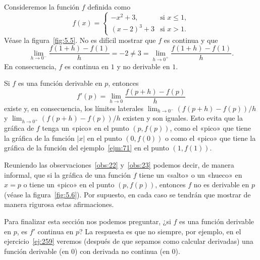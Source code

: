 \documentclass[12pt,a4paper]{book}
\begin{document}
    \begin{ejemplo}\label{ejm:71}
        Consideremos la
        función $f$ definida como
        \begin{equation*}
            f(x)=\begin{cases}
                -x^{2}+3, & \text{si }x\leq 1,\\
                (x-2)^{3}+3 & \text{si }x>1.
            \end{cases}
        \end{equation*}
        Véase la figura~\ref{fig:5.5}. No es difícil mostrar que $f$ es continua y que
        \begin{equation*}
            \lim_{h\to 0^{-}}\frac{f(1+h)-f(1)}{h}=-2\neq 3=\lim_{h\to 0^{+}}\frac{f(1+h)-f(1)}{h}.
        \end{equation*}
        En consecuencia, $f$ es continua en $1$ y no derivable en $1$.
    \end{ejemplo}

    \begin{observacion}\label{obs:23}
        Si $f$ es una función derivable en $p$, entonces
        \begin{equation*}
            f'(p)=\lim_{h\to 0}\frac{f(p+h)-f(p)}{h}
        \end{equation*}
        existe y, en consecuencia, los límites laterales $\lim_{h\to 0^{-}}(f(p+h)-f(p))/h$ y
        $\lim_{h\to 0^{+}}(f(p+h)-f(p))/h$ existen y son iguales. Esto evita que la gráfica
        de $f$ tenga un «pico» en el punto $(p,f(p))$, como el «pico» que tiene la
        gráfica de la función $|x|$ en el punto $(0,f(0))$ o como el «pico» que tiene la
        gráfica de la función del ejemplo~\ref{ejm:71} en el punto $(1,f(1))$.
    \end{observacion}

    Reuniendo las observaciones~\ref{obs:22} y~\ref{obs:23} podemos decir, de manera informal,
    que si la gráfica de una función $f$ tiene un «salto» o un «hueco» en $x=p$ o
    tiene un «pico» en el punto $(p,f(p))$, entonces $f$ no es derivable en $p$ (véase
    la figura~\ref{fig:5.6}). Por supuesto, en cada caso se tendrán que mostrar de manera
    rigurosa estas afirmaciones.

    Para finalizar esta sección nos podemos preguntar, ¿si $f$ es una función
    derivable en $p$, es $f'$ continua en $p$? La respuesta es que no siempre, por
    ejemplo, en el ejercicio~\ref{ej:259} veremos (después de que sepamos como calcular
    derivadas) una función derivable (en $0$) con derivada no continua (en $0$).
\end{document}
